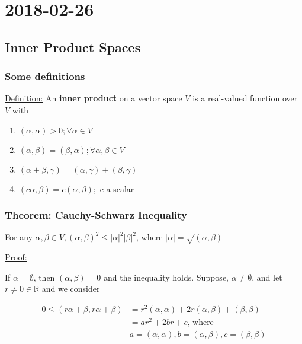 \section{2018-02-26}

\subsection{Inner Product Spaces}

\subsubsection{Some definitions}

\underline{Definition:} An \textbf{inner product} on a vector space $V$ is a real-valued function over $V$ with

\begin{enumerate}
  \item $(\alpha, \alpha) > 0; \forall \alpha \in V$ 
  \item $(\alpha, \beta) = (\beta, \alpha); \forall \alpha, \beta \in V$ 
  \item $(\alpha + \beta, \gamma) = (\alpha, \gamma) + (\beta, \gamma)$
  \item $(c\alpha, \beta) = c(\alpha, \beta);$ c a scalar
\end{enumerate}

\subsubsection{Theorem: Cauchy-Schwarz Inequality}

For any $\alpha, \beta \in V, (\alpha, \beta)^2 \leq |\alpha|^2 |\beta|^2$, where $|\alpha| = \sqrt{(\alpha, \beta)}$

\underline{Proof:}

If $\alpha = \emptyset$, then $(\alpha, \beta) = 0$ and the inequality holds. Suppose, $\alpha \neq \emptyset$, and let $r \neq 0 \in \mathbb{R}$ and we consider

\begin{align*}
  0 \leq (r\alpha + \beta, r\alpha + \beta) & = r^2(\alpha, \alpha) + 2r(\alpha, \beta) + (\beta, \beta) \\
                                            & = a r^2 + 2br + c\text{, where} \\
                                            & a = (\alpha, \alpha), b = (\alpha, \beta), c = (\beta, \beta)
\end{align*}

